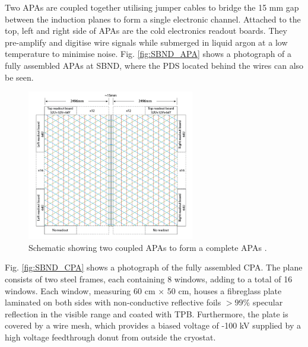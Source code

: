 Two APAs are coupled together utilising jumper cables to bridge the 15 mm gap between the induction planes to form a single electronic channel. 
Attached to the top, left and right side of APAs are the cold electronics readout boards.
They pre-amplify and digitise wire signals while submerged in liquid argon at a low temperature to minimise noise. 
Fig. \ref{fig:SBND_APA} shows a photograph of a fully assembled APAs at SBND, where the PDS located behind the wires can also be seen.  

\begin{figure}[hb!] 
\centering    
\includegraphics[width=0.65\textwidth]{SBND_APA}
\caption[Anode Plane Assemblies Schematic]{
Schematic showing two coupled APAs to form a complete APAs \cite{SBNProposal}.
}
\label{fig:SBND_APA_diag}
\end{figure}

Fig. \ref{fig:SBND_CPA} shows a photograph of the fully assembled CPA.                                                                                                                                 
The plane consists of two steel frames, each containing 8 windows, adding to a total of 16 windows.                                                                                                    
Each window, measuring 60 cm $\times$ 50 cm, houses a fibreglass plate laminated on both sides with non-conductive reflective foils $> 99\%$ specular reflection in the visible range and coated with TPB.                                                                                                                                                                                                    
Furthermore, the plate is covered by a wire mesh, which provides a biased voltage of -100 kV supplied by a high voltage feedthrough donut from outside the cryostat.                                   
                                                                                                                                                                                                       
